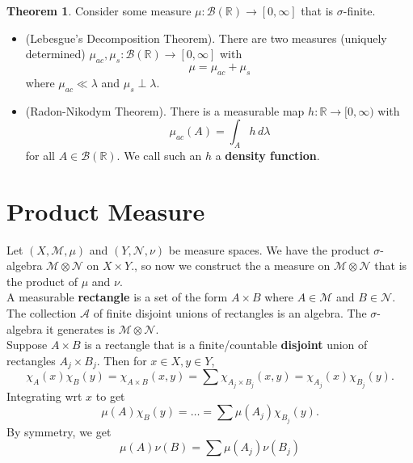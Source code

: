 \documentclass{article}
\theoremstyle{definition}
\theoremstyle{theorem}
\newtheorem{theorem}{Theorem}[section]
\begin{document}
\begin{theorem}
Consider some measure $\mu : \mathcal{B}(\mathbb{R}) \to [0,\infty]$ that is $\sigma$-finite.
\begin{itemize}
    \item (Lebesgue's Decomposition Theorem). There are two measures (uniquely determined) $\mu_{ac}, \mu_{s}: \mathcal{B}(\mathbb{R}) \to [0,\infty]$ with
    \begin{equation*}
        \mu = \mu_{ac} + \mu_{s}
    \end{equation*}
    where $\mu_{ac}\ll \lambda$ and $\mu_s \perp \lambda$.
    
    \item (Radon-Nikodym Theorem). There is a measurable map $h: \mathbb{R} \to [0,\infty)$ with
    \begin{equation*}
        \mu_{ac}(A) = \int_A h\,d\lambda
    \end{equation*}
    for all $A \in \mathcal{B}(\mathbb{R})$. We call such an $h$ a \textbf{density function}. 
\end{itemize}
\end{theorem}








\section{Product Measure}

Let $(X,\mathcal{M},\mu)$ and $(Y,\mathcal{N},\nu)$ be measure spaces. We have the product $\sigma$-algebra $\mathcal{M}\otimes \mathcal{N}$ on $X\times Y$., so now we construct the a measure on $\mathcal{M} \otimes \mathcal{N}$ that is the product of $\mu$ and $\nu$. \\

A measurable \textbf{rectangle} is a set of the form $A\times B$ where $A\in \mathcal{M}$ and $B \in \mathcal{N}$. The collection $\mathcal{A}$ of finite disjoint unions of rectangles is an algebra. The $\sigma$-algebra it generates is $\mathcal{M} \otimes \mathcal{N}$. \\


Suppose $A\times B$ is a rectangle that is a finite/countable \textbf{disjoint} union of rectangles $A_j \times B_j$. Then for $x\in X, y\in Y$,
\begin{equation*}
    \chi_A(x)\chi_B(y) = \chi_{A\times B}(x,y) = \sum \chi_{A_j \times B_j}(x,y) =  \chi_{A_j}(x)\chi_{B_j}(y).
\end{equation*}
Integrating wrt $x$ to get
\begin{equation*}
    \mu(A)\chi_B(y) = \dots = \sum \mu(A_j)\chi_{B_j}(y).
\end{equation*}
By symmetry, we get
\begin{equation*}
    \mu(A)\nu(B) = \sum \mu(A_j)\nu(B_j)
\end{equation*}
\end{document}

